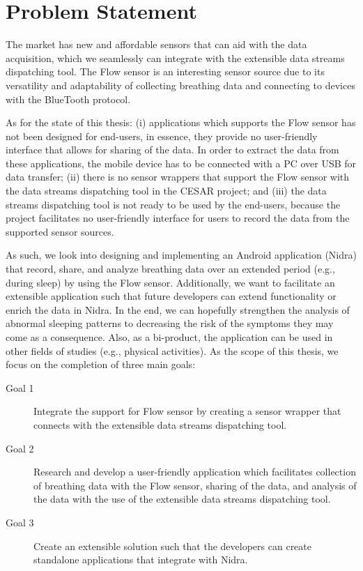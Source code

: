 \section{Problem Statement}

The market has new and affordable sensors that can aid with the data acquisition, which we seamlessly can integrate with the extensible data streams dispatching tool. The Flow sensor is an interesting sensor source due to its versatility and adaptability of collecting breathing data and connecting to devices with the BlueTooth protocol. 

As for the state of this thesis: (i) applications which supports the Flow sensor has not been designed for end-users, in essence, they provide no user-friendly interface that allows for sharing of the data. In order to extract the data from these applications, the mobile device has to be connected with a PC over USB for data transfer; (ii) there is no sensor wrappers that support the Flow sensor with the data streams dispatching tool in the CESAR project; and (iii) the data streams dispatching tool is not ready to be used by the end-users, because the project facilitates no user-friendly interface for users to record the data from the supported sensor sources.

As such, we look into designing and implementing an Android application (Nidra) that record, share, and analyze breathing data over an extended period (e.g., during sleep) by using the Flow sensor. Additionally, we want to facilitate an extensible application such that future developers can extend functionality or enrich the data in Nidra. In the end, we can hopefully strengthen the analysis of abnormal sleeping patterns to decreasing the risk of the symptoms they may come as a consequence. Also, as a bi-product, the application can be used in other fields of studies (e.g., physical activities). As the scope of this thesis, we focus on the completion of three main goals:

\begin{description}
    \item[Goal 1] Integrate the support for Flow sensor by creating a sensor wrapper that connects with the extensible data streams dispatching tool.
    \item[Goal 2] Research and develop a user-friendly application which facilitates collection of breathing data with the Flow sensor, sharing of the data, and analysis of the data with the use of the extensible data streams dispatching tool.
    \item[Goal 3] Create an extensible solution such that the developers can create standalone applications that integrate with Nidra. 
\end{description}

